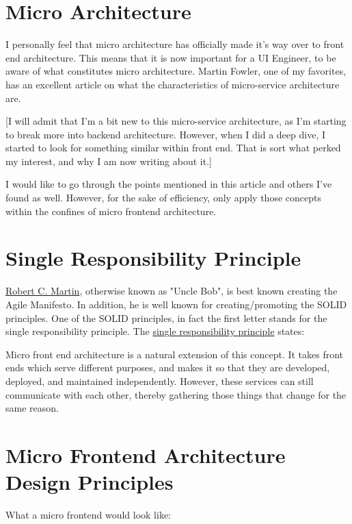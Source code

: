 \section{Micro Architecture}
I personally feel that micro architecture has officially made it's way over to front end architecture. This means that it is now important for a UI Engineer, to be aware of what constitutes micro architecture. Martin Fowler, one of my favorites, has an excellent article on what the characteristics of micro-service architecture are. 

[I will admit that I'm a bit new to this micro-service architecture, as I'm starting to break more into backend architecture. However, when I did a deep dive, I started to look for something similar within front end. That is sort what perked my interest, and why I am now writing about it.]

I would like to go through the points mentioned in this article and others I've found as well. However, for the sake of efficiency, only apply those concepts within the confines of micro frontend architecture.

\section{Single Responsibility Principle}
\href{https://en.wikipedia.org/wiki/Robert_C._Martin}{Robert C. Martin}, otherwise known as "Uncle Bob", is best known creating the Agile Manifesto. In addition, he is well known for creating/promoting the SOLID principles. One of the SOLID principles, in fact the first letter stands for the single responsibility principle. The \href{https://en.wikipedia.org/wiki/Single_responsibility_principle}{single responsibility principle} states:

\begin{quote}
\end{quote}

Micro front end architecture is a natural extension of this concept. It takes front ends which serve different purposes, and makes it so that they are developed, deployed, and maintained independently. However, these services can still communicate with each other, thereby gathering those things that change for the same reason.

\section{Micro Frontend Architecture Design Principles}
What a micro frontend would look like:

